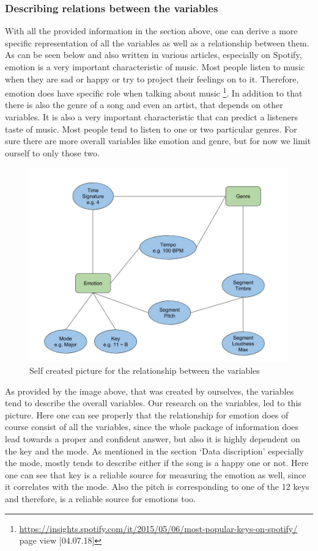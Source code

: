 \documentclass[]{article}
\let\rmarkdownfootnote\footnote%
\def\footnote{\protect\rmarkdownfootnote}
\begin{document}
\subsubsection{Describing relations between the
variables}\label{describing-relations-between-the-variables}

With all the provided information in the section above, one can derive a
more specific representation of all the variables as well as a
relationship between them. As can be seen below and also written in
various articles, especially on Spotify, emotion is a very important
characteristic of music. Most people listen to music when they are sad
or happy or try to project their feelings on to it. Therefore, emotion
does have specific role when talking about music \footnote{\url{https://insights.spotify.com/it/2015/05/06/most-popular-keys-on-spotify/}
  page view {[}04.07.18{]}}. In addition to that there is also the genre
of a song and even an artist, that depends on other variables. It is
also a very important characteristic that can predict a listeners taste
of music. Most people tend to listen to one or two particular genres.
For sure there are more overall variables like emotion and genre, but
for now we limit ourself to only those two.

\begin{figure}
\centering
\includegraphics{./picturesDocu/Variable.jpg}
\caption{Self created picture for the relationship between the
variables}
\end{figure}

As provided by the image above, that was created by ourselves, the
variables tend to describe the overall variables. Our research on the
variables, led to this picture. Here one can see properly that the
relationship for emotion does of course consist of all the variables,
since the whole package of information does lead towards a proper and
confident answer, but also it is highly dependent on the key and the
mode. As mentioned in the section `Data discription' especially the
mode, mostly tends to describe either if the song is a happy one or not.
Here one can see that key is a reliable source for measuring the emotion
as well, since it correlates with the mode. Also the pitch is
corresponding to one of the 12 keys and therefore, is a reliable source
for emotions too.
\end{document}
